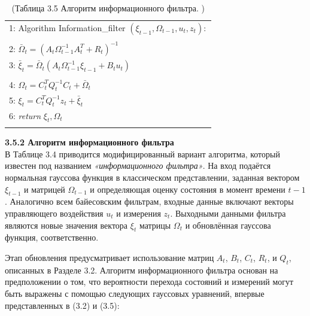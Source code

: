 \documentclass[10pt,a4paper]{article}
\begin{document}
\begin{table}[H]
\begin{center}
\begin{tabular}{|l|}
\hline
1: \hspace{3mm} Algorithm Information\_filter $(\xi_{t-1},\varOmega_{t-1},u_t,z_t):$ \\
{}\\
2: \hspace{7mm} 
$\bar{\varOmega}_t=(A_t\varOmega_{t-1}^{-1}A_t^T+R_t)^{-1}$\\
3: \hspace{7mm} $\bar{\xi}_t=\bar{\varOmega}_t(A_t\varOmega_{t-1}^{-1}\xi_{t-1}+B_t u_t)$\\
{}\\
4: \hspace{7mm} $\varOmega_t=C_t^T Q_t^{-1}C_t+\bar{\varOmega}_t$\\
5: \hspace{7mm} $\xi_t=C_t^T Q_t^{-1}z_t+\bar{\xi}_t$\\
6: \hspace{7mm}
\textit{return} $\xi_t,\varOmega_t$\\
{}\\
\hline
\end{tabular}
\caption{(Таблица 3.5 Алгоритм информационного фильтра. )}
\end{center}
\end{table}

\textbf{3.5.2 Алгоритм информационного фильтра}\\


В Таблице 3.4 приводится модифицированный вариант алгоритма, который известен под названием \textit{«информационного фильтра»}. На вход подаётся нормальная гауссова функция в классическом представлении, заданная вектором  $\xi_{t-1}$ и матрицей   $\varOmega_{t-1}$ и определяющая оценку состояния в момент времени $t-1$. Аналогично всем байесовским фильтрам, входные данные включают векторы управляющего воздействия $u_t$ и измерения $z_t$. Выходными данными фильтра являются новые значения вектора $\xi_t$  матрицы $\varOmega_t$ и обновлённая гауссова функция, соответственно.

Этап обновления предусматривает использование матриц $ A_t $, $ B_t $, $ C_t $, $ R_t $, и $ Q_t $, описанных в Разделе 3.2. Алгоритм информационного фильтра основан на предположении о том, что вероятности перехода состояний и измерений могут быть выражены с помощью следующих гауссовых уравнений, впервые представленных в (3.2) и (3.5):\\
\end{document}

